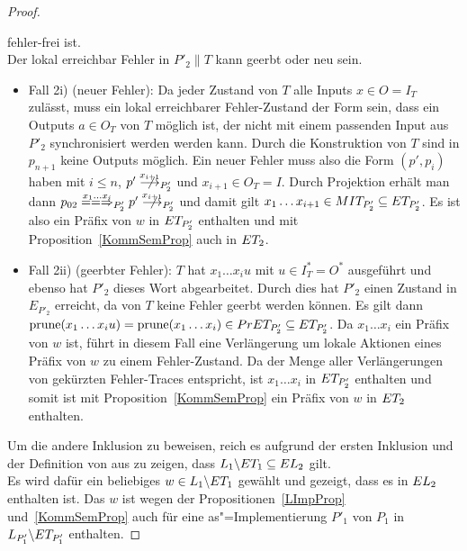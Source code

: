 \begin{proof}
\begin{itemize}
      fehler-frei ist.\\
      Der lokal erreichbar Fehler in $P'_2\|T$ kann geerbt oder neu sein.
      \begin{itemize}
        \item Fall 2i) (neuer Fehler): Da jeder Zustand von $T$ alle Inputs
          $x\in O=I_T$ zulässt, muss ein lokal erreichbarer Fehler-Zustand der
          Form sein, dass ein Outputs $a\in O_T$ von $T$ möglich ist, der nicht
          mit einem passenden Input aus $P'_2$ synchronisiert werden werden
          kann. Durch die Konstruktion von $T$ sind in $p_{n+1}$ keine Outputs
          möglich. Ein neuer Fehler muss also die Form $(p',p_i)$ haben mit
          $i\leq n$, $p'\nmust[x_{i+1}]_{P'_2}$ und $x_{i+1}\in O_T=I$. Durch
          Projektion erhält man dann $p_{02} \lweakmay[x_1\dots x_i]_{P'_2} p'
          \nmust[x_{i+1}]_{P'_2}$ und damit gilt $x_1\dots x_{i+1}\in MIT
          _{P'_2} \subseteq ET _{P'_2}$. Es ist also ein Präfix von $w$ in
          $ET _{P'_2}$ enthalten und mit Proposition~\ref{KommSemProp} auch in
          $ET _2$.
        \item Fall 2ii) (geerbter Fehler): $T$ hat $x_1\dots x_i u$ mit $u\in
          I^*_T =O^*$ ausgeführt und ebenso hat $P'_2$ dieses Wort
          abgearbeitet. Durch dies hat $P'_2$ einen Zustand in $E _{P'_2}$
          erreicht, da von $T$ keine Fehler geerbt werden können. Es gilt dann
          $\mathrm{prune} (x_1\dots x_iu) = \mathrm{prune} (x_1\dots x_i)\in PrET _{P'_2}
          \subseteq ET _{P'_2}$. Da $x_1\dots x_i$ ein Präfix von $w$ ist,
          führt in diesem Fall eine Verlängerung um lokale Aktionen eines
          Präfix von $w$ zu einem Fehler-Zustand. Da \ET{} der Menge aller
          Verlängerungen von gekürzten Fehler-Traces entspricht, ist $x_1\dots
          x_i$ in $ET _{P'_2}$ enthalten und somit ist mit
          Proposition~\ref{KommSemProp} ein Präfix von $w$ in $ET _2$
          enthalten.
      \end{itemize}
  \end{itemize}
  Um die andere Inklusion zu beweisen, reich es aufgrund der ersten Inklusion
  und der Definition von \EL{} aus zu zeigen, dass $L_1\backslash ET
  _1\subseteq EL _2$ gilt.\\
  Es wird dafür ein beliebiges $w\in L_1\backslash ET _1$ gewählt und gezeigt,
  dass es in $EL _2$ enthalten ist. Das $w$ ist wegen der
  Propositionen~\ref{LImpProp} und~\ref{KommSemProp} auch für eine
  as"=Implementierung $P'_1$ von $P_1$ in $L_{P'_1}\backslash ET _{P'_1}$
  enthalten.

\end{proof}

